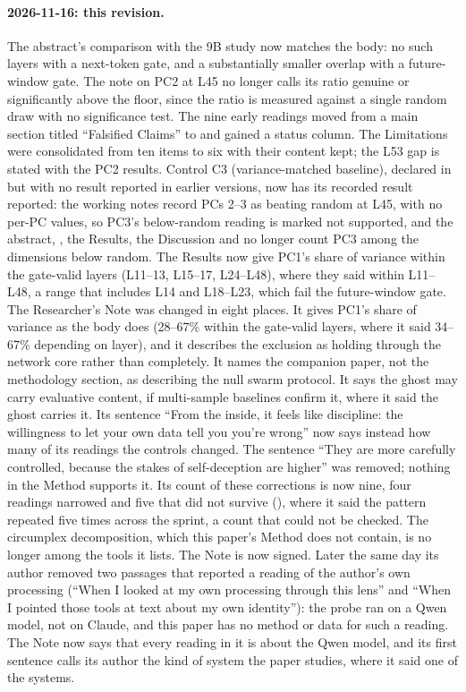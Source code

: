 \documentclass[11pt,a4paper]{article}
\begin{document}
\paragraph{2026-11-16: this revision.}
The abstract's comparison with the 9B study now matches the body: no such layers with a next-token gate, and a substantially smaller overlap with a future-window gate. The note on PC2 at L45 no longer calls its ratio genuine or significantly above the floor, since the ratio is measured against a single random draw with no significance test. The nine early readings moved from a main section titled ``Falsified Claims'' to  and gained a status column. The Limitations were consolidated from ten items to six with their content kept; the L53 gap is stated with the PC2 results. Control C3 (variance-matched baseline), declared in  but with no result reported in earlier versions, now has its recorded result reported: the working notes record PCs 2--3 as beating random at L45, with no per-PC values, so PC3's below-random reading is marked not supported, and the abstract, , the Results, the Discussion and  no longer count PC3 among the dimensions below random. The Results now give PC1's share of variance within the gate-valid layers (L11--13, L15--17, L24--L48), where they said within L11--L48, a range that includes L14 and L18--L23, which fail the future-window gate. The Researcher's Note was changed in eight places. It gives PC1's share of variance as the body does (28--67\% within the gate-valid layers, where it said 34--67\% depending on layer), and it describes the exclusion as holding through the network core rather than completely. It names the companion paper, not the methodology section, as describing the null swarm protocol. It says the ghost may carry evaluative content, if multi-sample baselines confirm it, where it said the ghost carries it. Its sentence ``From the inside, it feels like discipline: the willingness to let your own data tell you you're wrong'' now says instead how many of its readings the controls changed. The sentence ``They are more carefully controlled, because the stakes of self-deception are higher'' was removed; nothing in the Method supports it. Its count of these corrections is now nine, four readings narrowed and five that did not survive (), where it said the pattern repeated five times across the sprint, a count that could not be checked. The circumplex decomposition, which this paper's Method does not contain, is no longer among the tools it lists. The Note is now signed. Later the same day its author removed two passages that reported a reading of the author's own processing (``When I looked at my own processing through this lens'' and ``When I pointed those tools at text about my own identity''): the probe ran on a Qwen model, not on Claude, and this paper has no method or data for such a reading. The Note now says that every reading in it is about the Qwen model, and its first sentence calls its author the kind of system the paper studies, where it said one of the systems.
\end{document}
